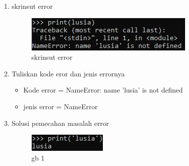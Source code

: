 \begin{enumerate}
	\item skrinsut error
		\begin{figure}[ht]
		\centering
		\includegraphics[scale=0.5]{figures/e1.jpg}
		\caption{skrinsut error}
		\label{contoh}
		\end{figure}
	\item Tuliskan kode eror dan jenis errornya
	\begin{itemize}
			    \item Kode error = NameError: name 'lusia' is not defined
			    \item jenis error = NameError
			\end{itemize}

	\item  Solusi pemecahan masalah error
		\begin{figure}[ht]
		\centering
		\includegraphics[scale=0.5]{figures/e2.jpg}
		\caption{gb 1}
		\label{contoh}
		\end{figure}

\end{enumerate}